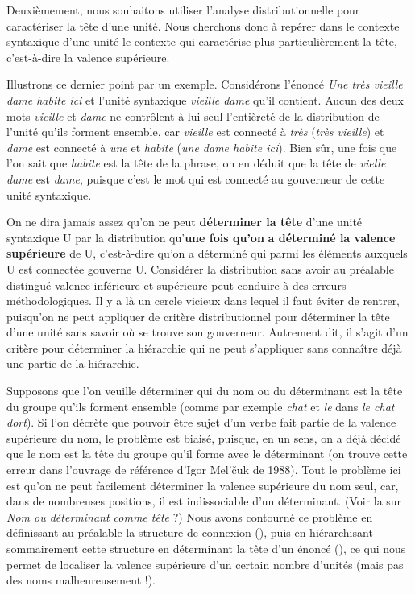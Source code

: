 Deuxièmement, nous souhaitons utiliser l’analyse distributionnelle pour caractériser la tête d’une unité. Nous cherchons donc à repérer dans le contexte syntaxique d’une unité le contexte qui caractérise plus particulièrement la tête, c’est-à-dire la valence supérieure.

Illustrons ce dernier point par un exemple. Considérons l’énoncé \textit{Une très vieille dame habite ici} et l’unité syntaxique \textit{vieille dame} qu’il contient. Aucun des deux mots \textit{vieille} et \textit{dame} ne contrôlent à lui seul l’entièreté de la distribution de l’unité qu’ils forment ensemble, car \textit{vieille} est connecté à \textit{très} (\textit{très vieille}) et \textit{dame} est connecté à \textit{une} et \textit{habite} (\textit{une dame habite ici}). Bien sûr, une fois que l’on sait que \textit{habite} est la tête de la phrase, on en déduit que la tête de \textit{vielle dame} est \textit{dame}, puisque c’est le mot qui est connecté au gouverneur de cette unité syntaxique.

On ne dira jamais assez qu’on ne peut \textbf{déterminer la tête} d’une unité syntaxique U par la distribution qu’\textbf{une fois qu’on} \textbf{a déterminé la valence supérieure} de U, c’est-à-dire qu’on a déterminé qui parmi les éléments auxquels U est connectée gouverne U. Considérer la distribution sans avoir au préalable distingué valence inférieure et supérieure peut conduire à des erreurs méthodologiques. Il y a là un cercle vicieux dans lequel il faut éviter de rentrer, puisqu’on ne peut appliquer de critère distributionnel pour déterminer la tête d’une unité sans savoir où se trouve son gouverneur. Autrement dit, il s’agit d’un critère pour déterminer la hiérarchie qui ne peut s’appliquer sans connaître déjà une partie de la hiérarchie.

Supposons que l’on veuille déterminer qui du nom ou du déterminant est la tête du groupe qu’ils forment ensemble (comme par exemple \textit{chat} et \textit{le} dans \textit{le chat dort}). Si l’on décrète que pouvoir être sujet d’un verbe fait partie de la valence supérieure du nom, le problème est biaisé, puisque, en un sens, on a déjà décidé que le nom est la tête du groupe qu’il forme avec le déterminant (on trouve cette erreur dans l’ouvrage de référence d’Igor Mel’čuk de 1988). Tout le problème ici est qu’on ne peut facilement déterminer la valence supérieure du nom seul, car, dans de nombreuses positions, il est indissociable d’un déterminant. (Voir la  sur \textit{Nom ou déterminant comme tête} ?) Nous avons contourné ce problème en définissant au préalable la structure de connexion (), puis en hiérarchisant sommairement cette structure en déterminant la tête d’un énoncé (), ce qui nous permet de localiser la valence supérieure d’un certain nombre d’unités (mais pas des noms malheureusement !).

